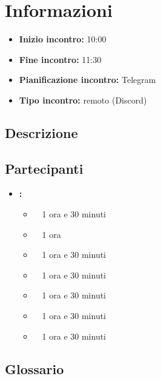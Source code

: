 \section{Informazioni}
\begin{itemize}
	\item \textbf{Inizio incontro:} 10:00
	\item \textbf{Fine incontro:} 11:30
	\item \textbf{Pianificazione incontro:} Telegram
	\item \textbf{Tipo incontro:} remoto (Discord)
\end{itemize}

\subsection{Descrizione}
\DocDescription

\subsection{Partecipanti}

\begin{itemize}
	\item \textbf{\GroupName:}
	\begin{itemize}
		\item \tommaso \ \rightarrow\ 1 ora e 30 minuti
		\item \marco \ \rightarrow\ 1 ora
		\item \riccardo \ \rightarrow\ 1 ora e 30 minuti
		\item \raul \ \rightarrow\ 1 ora e 30 minuti
		\item \martina \ \rightarrow\ 1 ora e 30 minuti
		\item \sebastiano \ \rightarrow\ 1 ora e 30 minuti
		\item \mattia \ \rightarrow\ 1 ora e 30 minuti
	\end{itemize}
\end{itemize}

\subsection{Glossario}
\GlossarioIntroduzione

\clearpage